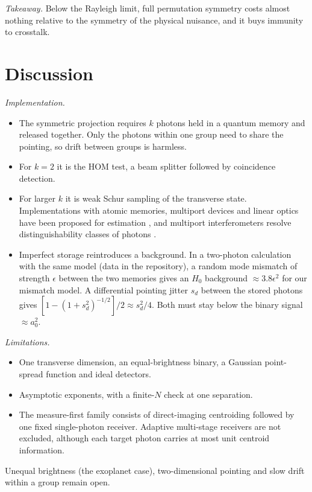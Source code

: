 \documentclass[reprint,pra,aps,amsmath,amssymb,superscriptaddress,nofootinbib]{revtex4-2}
\begin{document}
\emph{Takeaway.} Below the Rayleigh limit, full permutation symmetry costs almost nothing relative to the symmetry of
the physical nuisance, and it buys immunity to crosstalk.

\section{Discussion}
\label{sec:discussion}

\emph{Implementation.}
\begin{itemize}
\item The symmetric projection requires $k$ photons held in a quantum memory and released together. Only the photons
  within one group need to share the pointing, so drift between groups is harmless.
\item For $k=2$ it is the HOM test, a beam splitter followed by coincidence detection.
\item For larger $k$ it is weak Schur sampling of the transverse state. Implementations with atomic memories,
  multiport devices and linear optics have been proposed for estimation \cite{deAlmeida2025}, and multiport
  interferometers resolve distinguishability classes of photons \cite{Stanisic2018}.
\item Imperfect storage reintroduces a background. In a two-photon calculation with the same model (data in the
  repository), a random mode mismatch of strength $\epsilon$ between the two memories gives an $H_0$ background
  $\approx3.8\epsilon^2$ for our mismatch model. A differential pointing jitter $s_d$ between the stored photons gives
  $[1-(1+s_d^2)^{-1/2}]/2\approx s_d^2/4$. Both must stay below the binary signal $\approx a_0^2$.
\end{itemize}

\emph{Limitations.}
\begin{itemize}
\item One transverse dimension, an equal-brightness binary, a Gaussian point-spread function and ideal detectors.
\item Asymptotic exponents, with a finite-$N$ check at one separation.
\item The measure-first family consists of direct-imaging centroiding followed by one fixed single-photon receiver.
  Adaptive multi-stage receivers are not excluded, although each target photon carries at most unit centroid
  information.
\end{itemize}
Unequal brightness (the exoplanet case), two-dimensional pointing and slow drift within a group remain open.
\end{document}
